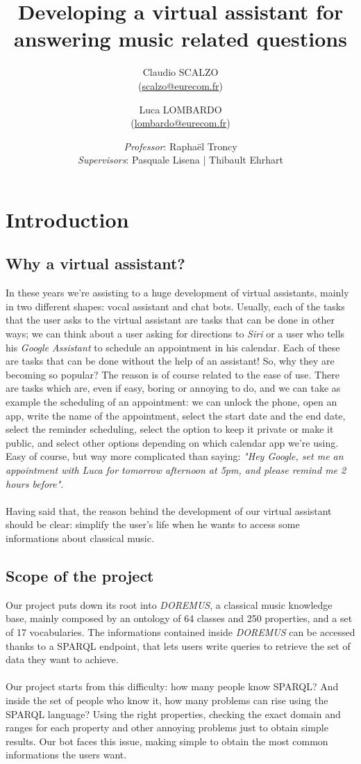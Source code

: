 \documentclass[a4paper,12pt]{report}
\title{Developing a virtual assistant for answering music related questions}
\author{Claudio SCALZO \\ (\href{mailto:scalzo@eurecom.fr}{scalzo@eurecom.fr}) \and Luca LOMBARDO \\ (\href{mailto:lombardo@eurecom.fr}{lombardo@eurecom.fr}) }
\date{\textit{Professor}: Raphaël Troncy\\\textit{Supervisors}: Pasquale Lisena | Thibault Ehrhart}
\begin{document}
\maketitle
\tableofcontents

\chapter{Introduction}
	\section{Why a virtual assistant?}
	In these years we're assisting to a huge development of virtual assistants, mainly in two different shapes: vocal assistant and chat bots. Usually, each of the tasks that the user asks to the virtual assistant are tasks that can be done in other ways; we can think about a user asking for directions to \textit{Siri} or a user who tells his \textit{Google Assistant} to schedule an appointment in his calendar. Each of these are tasks that can be done without the help of an assistant! So, why they are becoming so popular? The reason is of course related to the ease of use. There are tasks which are, even if easy, boring or annoying to do, and we can take as example the scheduling of an appointment: we can unlock the phone, open an app, write the name of the appointment, select the start date and the end date, select the reminder scheduling, select the option to keep it private or make it public, and select other options depending on which calendar app we're using. Easy of course, but way more complicated than saying: \textit{"Hey Google, set me an appointment with Luca for tomorrow afternoon at 5pm, and please remind me 2 hours before"}.\\\\
	Having said that, the reason behind the development of our virtual assistant should be clear: simplify the user's life when he wants to access some informations about classical music.
	
	\section{Scope of the project}
	Our project puts down its root into \textit{DOREMUS}\cite{doremus}, a classical music knowledge base, mainly composed by an ontology of 64 classes and 250 properties, and a set of 17 vocabularies. The informations contained inside \textit{DOREMUS} can be accessed thanks to a SPARQL endpoint, that lets users write queries to retrieve the set of data they want to achieve.\\\\
	Our project starts from this difficulty: how many people know SPARQL? And inside the set of people who know it, how many problems can rise using the SPARQL language? Using the right properties, checking the exact domain and ranges for each property and other annoying problems just to obtain simple results. Our bot faces this issue, making simple to obtain the most common informations the users want.
	
\end{document}
